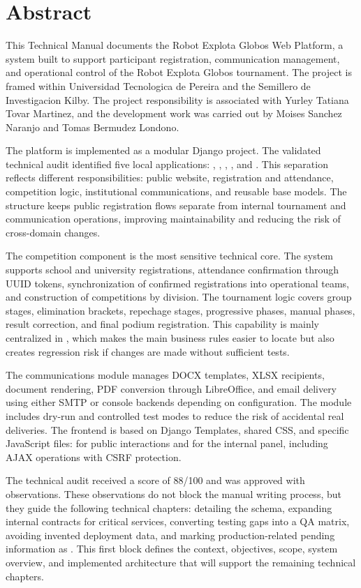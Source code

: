 \chapter*{Abstract}

This Technical Manual documents the Robot Explota Globos Web Platform, a system built to support participant registration, communication management, and operational control of the Robot Explota Globos tournament. The project is framed within Universidad Tecnologica de Pereira and the Semillero de Investigacion Kilby. The project responsibility is associated with Yurley Tatiana Tovar Martinez, and the development work was carried out by Moises Sanchez Naranjo and Tomas Bermudez Londono.

The platform is implemented as a modular Django project. The validated technical audit identified five local applications: , , , , and . This separation reflects different responsibilities: public website, registration and attendance, competition logic, institutional communications, and reusable base models. The structure keeps public registration flows separate from internal tournament and communication operations, improving maintainability and reducing the risk of cross-domain changes.

The competition component is the most sensitive technical core. The system supports school and university registrations, attendance confirmation through UUID tokens, synchronization of confirmed registrations into operational teams, and construction of competitions by division. The tournament logic covers group stages, elimination brackets, repechage stages, progressive phases, manual phases, result correction, and final podium registration. This capability is mainly centralized in , which makes the main business rules easier to locate but also creates regression risk if changes are made without sufficient tests.

The communications module manages DOCX templates, XLSX recipients, document rendering, PDF conversion through LibreOffice, and email delivery using either SMTP or console backends depending on configuration. The module includes dry-run and controlled test modes to reduce the risk of accidental real deliveries. The frontend is based on Django Templates, shared CSS, and specific JavaScript files:  for public interactions and  for the internal panel, including AJAX operations with CSRF protection.

The technical audit received a score of 88/100 and was approved with observations. These observations do not block the manual writing process, but they guide the following technical chapters: detailing the  schema, expanding internal contracts for critical services, converting testing gaps into a QA matrix, avoiding invented deployment data, and marking production-related pending information as \MarcadorProduccionPendiente. This first block defines the context, objectives, scope, system overview, and implemented architecture that will support the remaining technical chapters.
